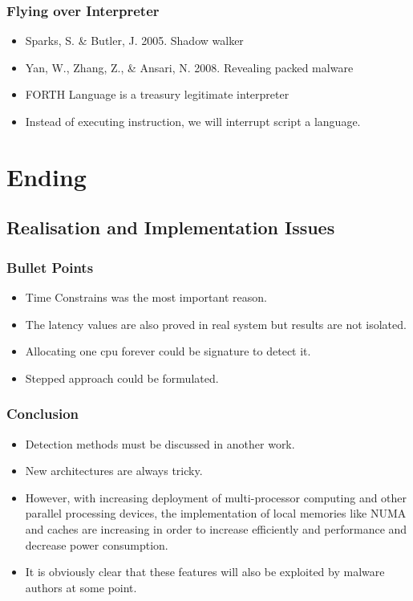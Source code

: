 \documentclass{beamer}
\begin{document}
\begin{frame}
	\frametitle{Flying over Interpreter}
	\begin{itemize}
		\item Sparks, S. \& Butler, J. 2005. Shadow walker
		\item Yan, W., Zhang, Z., \& Ansari, N. 2008. Revealing packed malware
		\item FORTH Language is a treasury legitimate interpreter
		\item Instead of executing instruction, we will interrupt script a language.
	\end{itemize}
\end{frame}









\section{Ending}
	\subsection{Realisation and Implementation Issues}

	\begin{frame}
		\frametitle{Bullet Points}
		\begin{itemize}
			\item Time Constrains was the most important reason.
			\item The latency values are also proved in real system but results are not isolated.
			\item Allocating one cpu forever could be signature to detect it. 
			\item Stepped approach could be formulated.
		\end{itemize}
	\end{frame}


\begin{frame}
	\frametitle{Conclusion}
	\begin{itemize}
		\item Detection methods must be discussed in another work.
		\item New architectures are always tricky.
		\item However, with increasing deployment of multi-processor computing and other parallel processing devices, the implementation of local memories like NUMA and caches are increasing in order to increase efficiently and performance and decrease power consumption. 
		\item It is obviously clear that these features will also be exploited by malware authors at some point. 
	\end{itemize}
\end{frame}
\end{document}
